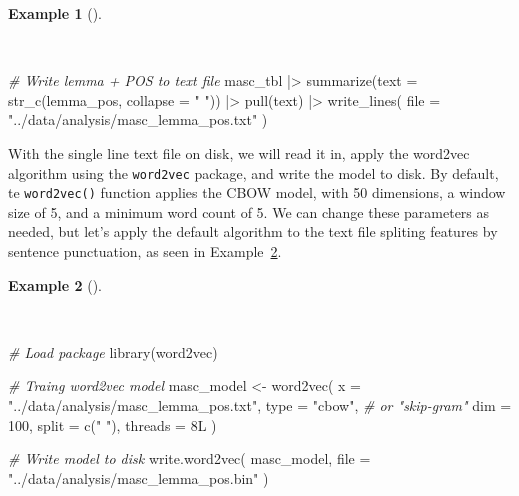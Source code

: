 \documentclass[
  letterpaper,
]{book}
\newenvironment{Shaded}{\begin{snugshade}}{\end{snugshade}}
\newcommand{\AttributeTok}[1]{\textcolor[rgb]{0.00,0.00,0.00}{#1}}
\newcommand{\CommentTok}[1]{\textcolor[rgb]{0.00,0.00,0.00}{\textit{#1}}}
\newcommand{\DecValTok}[1]{\textcolor[rgb]{0.00,0.00,0.00}{#1}}
\newcommand{\FunctionTok}[1]{\textcolor[rgb]{0.00,0.00,0.00}{#1}}
\newcommand{\NormalTok}[1]{\textcolor[rgb]{0.00,0.00,0.00}{#1}}
\newcommand{\OtherTok}[1]{\textcolor[rgb]{0.00,0.00,0.00}{#1}}
\newcommand{\SpecialCharTok}[1]{\textcolor[rgb]{0.00,0.00,0.00}{#1}}
\newcommand{\StringTok}[1]{\textcolor[rgb]{0.00,0.00,0.00}{#1}}
\theoremstyle{definition}
\newtheorem{example}{Example}[chapter]
\theoremstyle{remark}
\begin{document}
\begin{example}[]\protect\hypertarget{exm-explore-masc-vsm-write-txt}{}\label{exm-explore-masc-vsm-write-txt}

~

\begin{Shaded}
\begin{Highlighting}[]
\CommentTok{\# Write lemma + POS to text file}
\NormalTok{masc\_tbl }\SpecialCharTok{|\textgreater{}}
  \FunctionTok{summarize}\NormalTok{(}\AttributeTok{text =} \FunctionTok{str\_c}\NormalTok{(lemma\_pos, }\AttributeTok{collapse =} \StringTok{" "}\NormalTok{)) }\SpecialCharTok{|\textgreater{}}
  \FunctionTok{pull}\NormalTok{(text) }\SpecialCharTok{|\textgreater{}}
  \FunctionTok{write\_lines}\NormalTok{(}
    \AttributeTok{file =} \StringTok{"../data/analysis/masc\_lemma\_pos.txt"}
\NormalTok{  )}
\end{Highlighting}
\end{Shaded}

\end{example}

With the single line text file on disk, we will read it in, apply the
word2vec algorithm using the \texttt{word2vec} package, and write the
model to disk. By default, te \texttt{word2vec()} function applies the
CBOW model, with 50 dimensions, a window size of 5, and a minimum word
count of 5. We can change these parameters as needed, but let's apply
the default algorithm to the text file spliting features by sentence
punctuation, as seen in
Example~\ref{exm-explore-masc-vsm-word2vec-train}.

\begin{example}[]\protect\hypertarget{exm-explore-masc-vsm-word2vec-train}{}\label{exm-explore-masc-vsm-word2vec-train}

~

\begin{Shaded}
\begin{Highlighting}[]
\CommentTok{\# Load package}
\FunctionTok{library}\NormalTok{(word2vec)}

\CommentTok{\# Traing word2vec model}
\NormalTok{masc\_model }\OtherTok{\textless{}{-}}
  \FunctionTok{word2vec}\NormalTok{(}
    \AttributeTok{x =} \StringTok{"../data/analysis/masc\_lemma\_pos.txt"}\NormalTok{,}
    \AttributeTok{type =} \StringTok{"cbow"}\NormalTok{, }\CommentTok{\# or "skip{-}gram"}
    \AttributeTok{dim =} \DecValTok{100}\NormalTok{,}
    \AttributeTok{split =} \FunctionTok{c}\NormalTok{(}\StringTok{" "}\NormalTok{),}
    \AttributeTok{threads =} \DecValTok{8}\NormalTok{L}
\NormalTok{  )}

\CommentTok{\# Write model to disk}
\FunctionTok{write.word2vec}\NormalTok{(}
\NormalTok{  masc\_model,}
  \AttributeTok{file =} \StringTok{"../data/analysis/masc\_lemma\_pos.bin"}
\NormalTok{)}
\end{Highlighting}
\end{Shaded}

\end{example}
\end{document}
